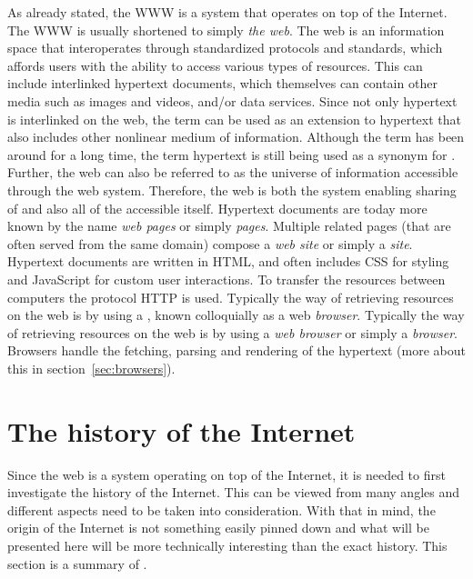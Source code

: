   As already stated, the \gls{WWW} is a system that operates on top of the Internet.
  The \gls{WWW} is usually shortened to simply \emph{the \gls{web}}.
  The \gls{web} is an information space that interoperates through standardized protocols and standards, which affords users with the ability to access various types of resources.
  This can include interlinked \gls{hypertext} \glspl{document}, which themselves can contain other media such as images and videos, and/or data services.
  Since not only \gls{hypertext} is interlinked on the \gls{web}, the term \emph{} can be used as an extension to \gls{hypertext} that also includes other nonlinear medium of information.
  Although the term  has been around for a long time, the term \gls{hypertext} is still being used as a synonym for .
  Further, the \gls{web} can also be referred to as the universe of information accessible through the \gls{web} system.
  Therefore, the \gls{web} is both the system enabling sharing of  and also all of the accessible  itself.
  Hypertext \glspl{document} are today more known by the name \emph{\gls{web} pages} or simply \emph{pages}.
  Multiple related pages (that are often served from the same domain) compose a \emph{web site} or simply a \emph{site}.
  Hypertext \glspl{document} are written in \gls{HTML}, and often includes \gls{CSS} for styling and \gls{JavaScript} for custom user interactions.
  To transfer the resources between computers the protocol \gls{HTTP} is used.
  Typically the way of retrieving resources on the web is by using a \emph{}, known colloquially as a \gls{web} \emph{\gls{browser}}.
  Typically the way of retrieving resources on the \gls{web} is by using a \emph{\gls{web} \gls{browser}} or simply a \emph{\gls{browser}}.
  Browsers handle the fetching, parsing and rendering of the \gls{hypertext} (more about this in section~\ref{sec:browsers}).
  
  \section{The history of the Internet}\label{sec:history-internet}
    Since the \gls{web} is a system operating on top of the Internet, it is needed to first investigate the history of the Internet.
    This can be viewed from many angles and different aspects need to be taken into consideration.
    With that in mind, the origin of the Internet is not something easily pinned down and what will be presented here will be more technically interesting than the exact history.
    This section is a summary of .

